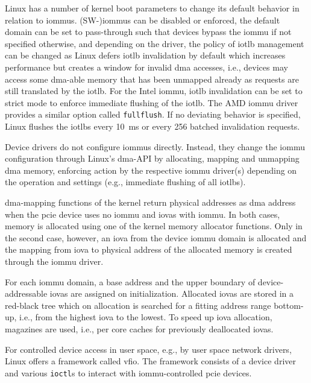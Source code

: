 Linux has a number of kernel boot parameters to change its default behavior in
relation to \acp{iommu}. (SW-)\acp{iommu} can be disabled or enforced, the
default domain can be set to pass-through such that devices bypass the
\ac{iommu} if not specified otherwise, and depending on the driver, the policy
of \ac{iotlb} management can be changed as Linux defers \ac{iotlb} invalidation
by default which increases performance but creates a window for invalid \ac{dma}
accesses, i.e., devices may access some \ac{dma}-able memory that has been
unmapped already as requests are still translated by the \ac{iotlb}. For the
Intel \ac{iommu}, \ac{iotlb} invalidation can be set to strict mode to enforce
immediate flushing of the \ac{iotlb}. The AMD \ac{iommu} driver provides a
similar option called \texttt{fullflush}. If no deviating behavior is specified,
Linux flushes the \acp{iotlb} every \SI{10}{\ms} or every 256 batched
invalidation requests.

Device drivers do not configure \acp{iommu} directly. Instead, they change the
\ac{iommu} configuration through Linux's \ac{dma}-API by allocating, mapping and
unmapping \ac{dma} memory, enforcing action by the respective \ac{iommu}
driver(s) depending on the operation and settings (e.g., immediate flushing of
all \acp{iotlb}).

\ac{dma}-mapping functions of the kernel return physical addresses as \ac{dma}
address when the \ac{pcie} device uses no \ac{iommu} and \acp{iova} with
\ac{iommu}. In both cases, memory is allocated using one of the kernel memory
allocator functions. Only in the second case, however, an \ac{iova} from the
device \ac{iommu} domain is allocated and the mapping from \ac{iova} to physical
address of the allocated memory is created through the \ac{iommu} driver.

For each \ac{iommu} domain, a base address and the upper boundary of
device-addressable \acp{iova} are assigned on initialization. Allocated
\acp{iova} are stored in a red-black tree which on allocation is searched for a
fitting address range bottom-up, i.e., from the highest \ac{iova} to the lowest.
To speed up \ac{iova} allocation, magazines are used, i.e., per core caches for
previously deallocated \acp{iova}.

For controlled device access in user space, e.g., by user space network drivers,
Linux offers a framework called \ac{vfio}. The framework consists of a device
driver and various \texttt{ioctl}s to interact with \ac{iommu}-controlled
\ac{pcie} devices.

